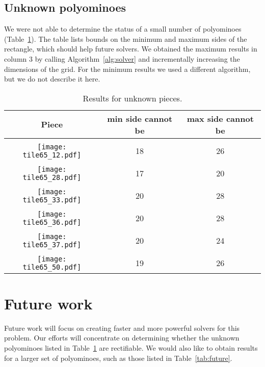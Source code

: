 \documentclass[10pt,a4paper]{article}
\theoremstyle{definition}
\begin{document}
\pagebreak
\subsection{Unknown polyominoes}

We were not able to determine the status of a small number of polyominoes (Table~\ref{tab:unknown}).
The table lists bounds on the minimum and maximum sides of the rectangle, which
should help future solvers. We obtained the maximum results in column 3 by calling Algorithm~\ref{alg:solver} and
incrementally increasing the dimensions of the grid. For the minimum results we used a different algorithm,
but we do not describe it here.

\begin{table}[h]
\centering
\begin{tabular}{|c|c|c|}
\hline
Piece & min side cannot be  & max side cannot be  \\ \hline
  & & \\ 
\texttt{[image: tile65\_12.pdf]} & 18 & 26 \\ \hline
  & & \\ 
\texttt{[image: tile65\_28.pdf]} & 17 & 20 \\ \hline
  & & \\ 
\texttt{[image: tile65\_33.pdf]} & 20 & 28 \\ \hline
  & & \\ 
\texttt{[image: tile65\_36.pdf]} & 20 & 28 \\ \hline
  & & \\ 
\texttt{[image: tile65\_37.pdf]} & 20 & 24 \\ \hline
  & & \\ 
\texttt{[image: tile65\_50.pdf]} & 19 & 26 \\ \hline
\end{tabular}
\caption{Results for unknown pieces.}
\label{tab:unknown}
\end{table}




\section{Future work}

Future work will focus on creating faster and more powerful solvers for this problem. Our efforts will concentrate on
determining whether the unknown polyominoes listed in Table~\ref{tab:unknown} are rectifiable. We would also like to obtain
results for a larger set of polyominoes, such as those listed in Table~\ref{tab:future}.
\end{document}
